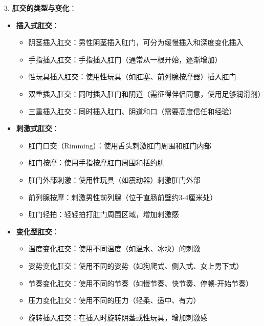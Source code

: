 \documentclass[12pt,UTF8]{ctexbook}
\begin{document}
3. \textbf{肛交的类型与变化}：
\begin{itemize}
	\item \textbf{插入式肛交}：
	\begin{itemize}
		\item 阴茎插入肛交：男性阴茎插入肛门，可分为缓慢插入和深度变化插入
		\item 手指插入肛交：手指插入肛门（通常从一根开始，逐渐增加）
		\item 性玩具插入肛交：使用性玩具（如肛塞、前列腺按摩器）插入肛门
		\item 双重插入肛交：同时插入肛门和阴道（需征得伴侣同意，使用足够润滑剂）
		\item 三重插入肛交：同时插入肛门、阴道和口（需要高度信任和经验）
	\end{itemize}
	\item \textbf{刺激式肛交}：
	\begin{itemize}
		\item 肛门口交（Rimming）：使用舌头刺激肛门周围和肛门内部
		\item 肛门按摩：使用手指按摩肛门周围和括约肌
		\item 肛门外部刺激：使用性玩具（如震动器）刺激肛门外部
		\item 前列腺按摩：刺激男性前列腺（位于直肠前壁约3-4厘米处）
		\item 肛门轻拍：轻轻拍打肛门周围区域，增加刺激感
	\end{itemize}
	\item \textbf{变化型肛交}：
	\begin{itemize}
		\item 温度变化肛交：使用不同温度（如温水、冰块）的刺激
		\item 姿势变化肛交：使用不同的姿势（如狗爬式、侧入式、女上男下式）
		\item 节奏变化肛交：使用不同的节奏（如慢节奏、快节奏、停顿-开始节奏）
		\item 压力变化肛交：使用不同的压力（轻柔、适中、有力）
		\item 旋转插入肛交：在插入时旋转阴茎或性玩具，增加刺激感
	\end{itemize}
\end{itemize}
\end{document}
